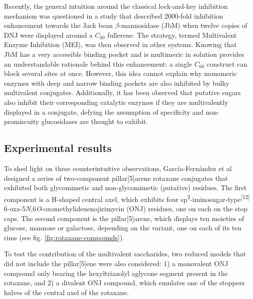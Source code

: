 Recently, the general intuition around the classical lock-and-key inhibition mechanism was questioned in a study that described 2000-fold inhibition enhancement towards the Jack bean $\beta$-mannosidase (JbM) when twelve copies of DNJ were displayed around a $C_{60}$ fullerene.\cite{compain2010glycosidase} The strategy, termed Multivalent Enzyme Inhibition (MEI), was then observed in other systems. Knowing that JbM has a very accessible binding pocket and is multimeric in solution provides an understandable rationale behind this enhancement: a single $C_{60}$  construct can block several sites at once. However, this idea cannot explain why monomeric enzymes with deep and narrow binding pockets are also inhibited by bulky multivalent conjugates. Additionally, it has been observed that putative sugars also inhibit their corresponding catalytic enzymes if they are multivalently displayed in a conjugate, defying the assumption of specificity and non-promiscuity glucosidases are thought to exhibit.

\subsection{Experimental results}

To shed light on these counterintuitive observations, García-Fernández et al  designed a series of two-component pillar[5]arene rotaxane conjugates that exhibited both glycomimetic and non-glycomimetic (putative) residues. The first component is a H-shaped central axel, which exhibits four sp\textsuperscript{2}-iminosugar-type\textsuperscript{[12]} 6-oxa-5\textit{N},6\textit{O}-oxomethylidenenojirimycin (ONJ) residues, one on each on the stop caps. The second component is the pillar[5]arene, which displays ten moieties of glucose, mannose or galactose, depending on the variant, one on each of its ten rims (see fig. \ref{fig:rotaxane-compounds}).

To test the contribution of the multivalent saccharides, two reduced models that did not include the pillar[5]ene were also considered: 1) a monovalent ONJ compound only bearing the hexyltriazolyl aglycone segment present in the rotaxane, and 2) a divalent ONJ compound, which emulates one of the stoppers halves of the central axel of the rotaxane.



